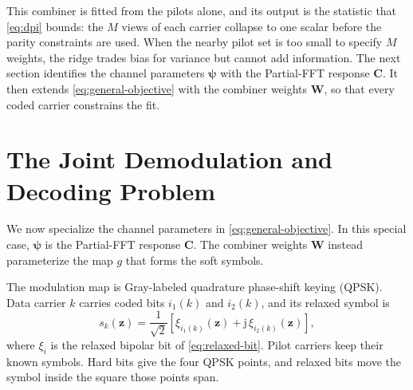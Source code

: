 \documentclass[conference]{IEEEtran}
\begin{document}
This combiner is fitted from the pilots alone, and its output is the
statistic that \eqref{eq:dpi} bounds: the \(M\) views of each carrier
collapse to one scalar before the parity constraints are used.  When the
nearby pilot set is too small to specify \(M\) weights, the ridge trades
bias for variance but cannot add information.  The next section identifies
the channel parameters \(\bm\psi\) with the Partial-FFT response \(\mathbf C\).
It then extends \eqref{eq:general-objective} with the combiner weights
\(\mathbf W\), so that every coded carrier constrains the fit.

\section{The Joint Demodulation and Decoding Problem}
\label{sec:joint}

We now specialize the channel parameters in \eqref{eq:general-objective}.
In this special case, \(\bm\psi\) is the Partial-FFT response \(\mathbf C\).
The combiner weights \(\mathbf W\) instead parameterize the map \(g\) that
forms the soft symbols.

The modulation map is Gray-labeled quadrature phase-shift keying (QPSK).
Data carrier \(k\) carries coded bits \(i_1(k)\) and \(i_2(k)\), and its
relaxed symbol is
\begin{equation}
  s_k(\mathbf z)
  =
  \frac{1}{\sqrt 2}
  \left[
  \xi_{i_1(k)}(\mathbf z)
  +
  \mathrm j\,\xi_{i_2(k)}(\mathbf z)
  \right],
  \label{eq:qpsk-relaxed}
\end{equation}
where \(\xi_i\) is the relaxed bipolar bit of \eqref{eq:relaxed-bit}.
Pilot carriers keep their known symbols.  Hard bits give the four QPSK
points, and relaxed bits move the symbol inside the square those points
span.
\end{document}
